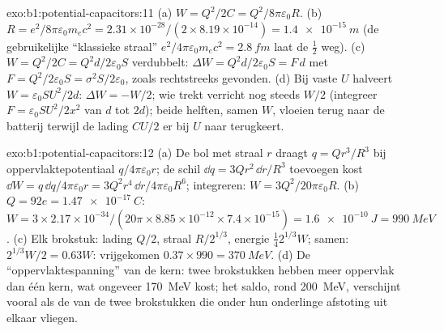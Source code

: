 \begin{solution}{exo:b1:potential-capacitors:11}
(a) $W = Q^2/2C = Q^2/8\pi\varepsilon_0R$. (b) $R = e^2/8\pi\varepsilon_0m_ec^2 = 2.31 \times
10^{-28}/(2 \times 8.19 \times 10^{-14}) = \qty{1.4e-15}{m}$ (de gebruikelijke ``klassieke
straal'' $e^2/4\pi\varepsilon_0m_ec^2 = \qty{2.8}{fm}$ laat de $\tfrac12$ weg). (c) $W =
Q^2/2C = Q^2d/2\varepsilon_0S$ verdubbelt: $\Delta W = Q^2d/2\varepsilon_0S = F\,d$ met $F =
Q^2/2\varepsilon_0S = \sigma^2S/2\varepsilon_0$, zoals rechtstreeks gevonden. (d) Bij vaste $U$ halveert $W =
\varepsilon_0SU^2/2d$: $\Delta W = -W/2$; wie trekt verricht nog steeds $W/2$
(integreer $F = \varepsilon_0SU^2/2x^2$ van $d$ tot $2d$); beide helften, samen $W$,
vloeien terug naar de batterij terwijl de lading $CU/2$ er bij
 $U$ naar terugkeert.
\end{solution}

\begin{solution}{exo:b1:potential-capacitors:12}
(a) De bol met straal $r$ draagt $q = Qr^3/R^3$ bij oppervlaktepotentiaal
$q/4\pi\varepsilon_0r$; de schil $\dd q = 3Qr^2\,\dd r/R^3$ toevoegen kost $\dd W =
q\,\dd q/4\pi\varepsilon_0r = 3Q^2r^4\,\dd r/4\pi\varepsilon_0R^6$; integreren: $W =
3Q^2/20\pi\varepsilon_0R$. (b) $Q = 92e = \qty{1.47e-17}{C}$: $W = 3 \times 2.17 \times
10^{-34}/(20\pi \times 8.85 \times 10^{-12} \times 7.4 \times 10^{-15}) = \qty{1.6e-10}{J}
= \qty{990}{MeV}$. (c) Elk brokstuk: lading $Q/2$, straal $R/2^{1/3}$,
energie $\tfrac14 2^{1/3}W$; samen: $2^{1/3}W/2 = 0.63W$: vrijgekomen
$0.37 \times 990 = \qty{370}{MeV}$. (d) De ``oppervlaktespanning'' van de kern:
twee brokstukken hebben meer oppervlak dan één kern, wat ongeveer
\qty{170}{MeV} kost; het saldo, rond \qty{200}{MeV}, verschijnt vooral als de
 van de twee brokstukken die onder hun onderlinge
afstoting uit elkaar vliegen.
\end{solution}

